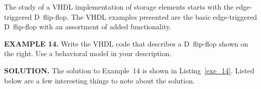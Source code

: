 The study of a VHDL implementation of storage elements starts with the edge-triggered D~flip-flop. The VHDL examples presented are the basic edge-triggered D~flip-flop with an assortment of added functionality.
\begin{leftbar}
\begin{minipage}{0.5\linewidth}
\noindent
\textbf{EXAMPLE 14.}
Write the VHDL code that describes a D~flip-flop shown on the right. Use a behavioral model in your description.
\end{minipage}
\begin{minipage}{0.47\linewidth}
\begin{flushright}
\end{flushright}
\end{minipage}
\end{leftbar}
\noindent
\textbf{SOLUTION.} The solution to Example~14 is shown in Listing~\ref{exe_14}. Listed below are a few interesting things to note about the solution.
